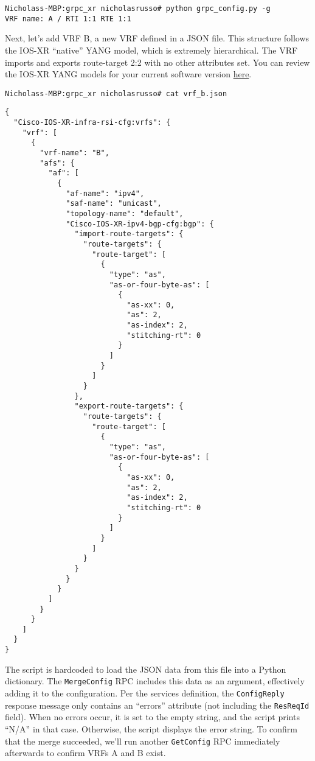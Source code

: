 \begin{verbatim}
Nicholass-MBP:grpc_xr nicholasrusso# python grpc_config.py -g
VRF name: A / RTI 1:1 RTE 1:1
\end{verbatim}

Next, let's add VRF B, a new VRF defined in a JSON file. This structure
follows the IOS-XR ``native'' YANG model, which is extremely hierarchical.
The VRF imports and exports route-target 2:2 with no other attributes set.
You can review the IOS-XR YANG models for your current software version
\href{https://github.com/YangModels/yang/tree/master/vendor/cisco/xr}{here}.

\begin{verbatim}
Nicholass-MBP:grpc_xr nicholasrusso# cat vrf_b.json
\end{verbatim}

\begin{verbatim}
{
  "Cisco-IOS-XR-infra-rsi-cfg:vrfs": {
    "vrf": [
      {
        "vrf-name": "B",
        "afs": {
          "af": [
            {
              "af-name": "ipv4",
              "saf-name": "unicast",
              "topology-name": "default",
              "Cisco-IOS-XR-ipv4-bgp-cfg:bgp": {
                "import-route-targets": {
                  "route-targets": {
                    "route-target": [
                      {
                        "type": "as",
                        "as-or-four-byte-as": [
                          {
                            "as-xx": 0,
                            "as": 2,
                            "as-index": 2,
                            "stitching-rt": 0
                          }
                        ]
                      }
                    ]
                  }
                },
                "export-route-targets": {
                  "route-targets": {
                    "route-target": [
                      {
                        "type": "as",
                        "as-or-four-byte-as": [
                          {
                            "as-xx": 0,
                            "as": 2,
                            "as-index": 2,
                            "stitching-rt": 0
                          }
                        ]
                      }
                    ]
                  }
                }
              }
            }
          ]
        }
      }
    ]
  }
}
\end{verbatim}

The script is hardcoded to load the JSON data from this file into a
Python dictionary. The \verb|MergeConfig| RPC includes this data as
an argument, effectively adding it to the configuration. Per the
services definition, the \verb|ConfigReply| response message only contains
an ``errors'' attribute (not including the \verb|ResReqId| field).
When no errors occur, it is set to the empty string, and the script prints
``N/A'' in that case. Otherwise, the script displays the error string. To
confirm that the merge succeeded, we'll run another \verb|GetConfig| RPC
immediately afterwards to confirm VRFs A and B exist.

